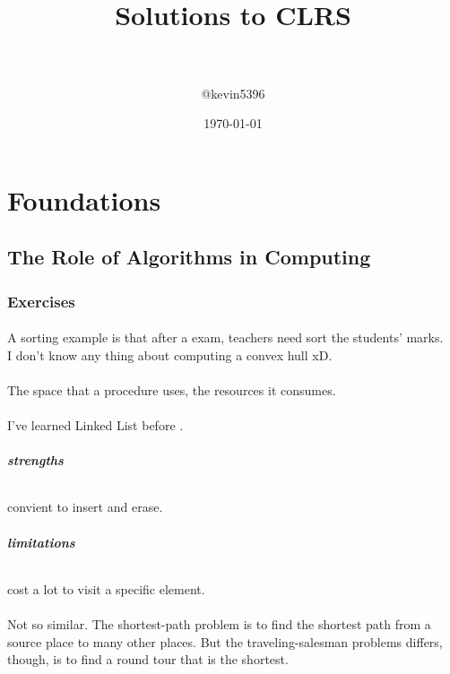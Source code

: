 \documentclass[paper=a4, fontsize=11pt,oneside]{book} %
\title{	
\normalfont \normalsize 
\horrule{0.5pt} \\[0.4cm] %
\huge Solutions to CLRS \\ %
\horrule{2pt} \\[0.5cm] %
}
\author{@kevin5396} %
\date{\normalsize\today} %
\numberwithin{equation}{section} %
\numberwithin{figure}{section} %
\numberwithin{table}{section} %
\begin{document}
\maketitle %
\tableofcontents
\newpage
%	
%
%
\part{Foundations}


\chapter{The Role of Algorithms in Computing}
	\section{Exercises}
		\subsection{}

		A sorting example is that after a exam, teachers need sort the students' marks.
		\\ I don't know any thing about computing a convex hull xD.
		\subsection{}
		The space that a procedure uses, the resources it consumes.
		\subsection{}
		I've learned Linked List before .
		\paragraph{\textbf{strengths}} convient to insert and erase.
		\paragraph{\textbf{limitations}} cost a lot to visit a specific element.
		
		\subsection{}
		Not so similar. The shortest-path problem is to find the shortest path from a source place to many other places. But the traveling-salesman problems differs, though, is to find a round tour that is the shortest.
		
\end{document}
